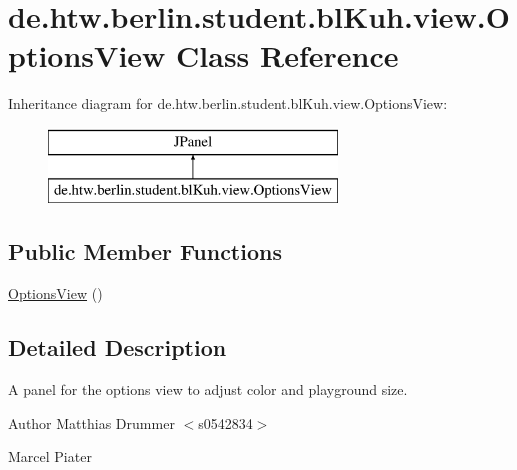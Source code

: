 \hypertarget{classde_1_1htw_1_1berlin_1_1student_1_1bl_kuh_1_1view_1_1_options_view}{\section{de.\-htw.\-berlin.\-student.\-bl\-Kuh.\-view.\-Options\-View Class Reference}
\label{classde_1_1htw_1_1berlin_1_1student_1_1bl_kuh_1_1view_1_1_options_view}
}
Inheritance diagram for de.\-htw.\-berlin.\-student.\-bl\-Kuh.\-view.\-Options\-View\-:\begin{figure}[H]
\begin{center}
\leavevmode
\includegraphics[height=2.000000cm]{classde_1_1htw_1_1berlin_1_1student_1_1bl_kuh_1_1view_1_1_options_view}
\end{center}
\end{figure}
\subsection*{Public Member Functions}
\begin{DoxyCompactItemize}
\item 
\hyperlink{classde_1_1htw_1_1berlin_1_1student_1_1bl_kuh_1_1view_1_1_options_view_af5ca1f039ea46744ee890c0bff34cf3b}{Options\-View} ()
\end{DoxyCompactItemize}


\subsection{Detailed Description}
A panel for the options view to adjust color and playground size.

\begin{DoxyAuthor}{Author}
Matthias Drummer $<$s0542834$>$ 

Marcel Piater 
\end{DoxyAuthor}


